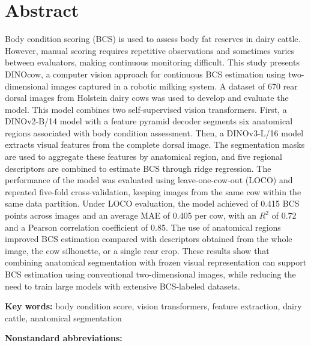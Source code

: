 \section*{Abstract}

Body condition scoring (BCS) is used to assess body fat reserves in dairy cattle.
However, manual scoring  requires repetitive observations and sometimes varies between evaluators, making continuous monitoring difficult.
This study presents DINOcow, a computer vision approach for continuous BCS estimation using two-dimensional images captured in a robotic milking system.
A dataset of 670 rear dorsal images from Holstein dairy cows was used to develop and evaluate the model.
This model combines two self-supervised vision transformers.
First, a DINOv2-B/14 model with a feature pyramid decoder segments six anatomical regions associated with body condition assessment.
Then, a DINOv3-L/16 model extracts visual features from the complete dorsal image.
The segmentation masks are used to aggregate these features by anatomical region, and five regional descriptors are combined to estimate BCS through ridge regression.
The performance of the model was evaluated using leave-one-cow-out (LOCO) and repeated five-fold cross-validation, keeping images from the same cow within the same data partition.
Under LOCO evaluation, the model achieved  of 0.415 BCS points across images and an average MAE of 0.405 per cow, with an $R^2$ of 0.72 and a Pearson correlation coefficient of 0.85.
The use of anatomical regions improved BCS estimation compared with descriptors obtained from the whole image, the cow silhouette, or a single rear crop.
These results show that combining anatomical segmentation with frozen visual representation can support BCS estimation using conventional two-dimensional images, while reducing the need to train large models with extensive BCS-labeled datasets.

\medskip
\noindent\textbf{Key words:} body condition score, vision transformers, feature extraction, dairy cattle, anatomical segmentation

\noindent\textbf{Nonstandard abbreviations:}


